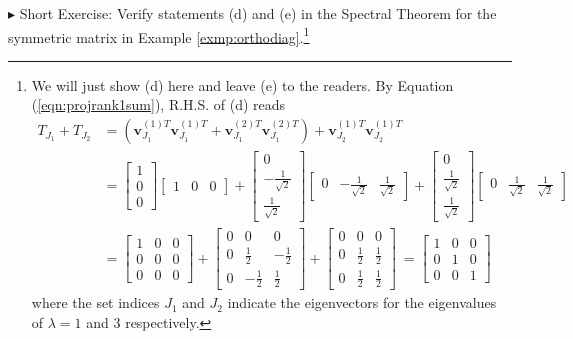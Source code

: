 $\blacktriangleright$ Short Exercise: Verify statements (d) and (e) in the Spectral Theorem for the symmetric matrix in Example \ref{exmp:orthodiag}.\footnote{We will just show (d) here and leave (e) to the readers. By Equation (\ref{eqn:projrank1sum}), R.H.S. of (d) reads
\begin{align*}
T_{J_1} + T_{J_2} &= (\textbf{v}_{J_1}^{(1)T}\textbf{v}_{J_1}^{(1)T} + \textbf{v}_{J_1}^{(2)T}\textbf{v}_{J_1}^{(2)T}) + \textbf{v}_{J_2}^{(1)T}\textbf{v}_{J_2}^{(1)T} \\
&= \begin{bmatrix}
1 \\
0 \\
0
\end{bmatrix}
\begin{bmatrix}
1 & 0 & 0
\end{bmatrix} + 
\begin{bmatrix}
0 \\
-\frac{1}{\sqrt{2}} \\
\frac{1}{\sqrt{2}}
\end{bmatrix}
\begin{bmatrix}
0 & -\frac{1}{\sqrt{2}} & \frac{1}{\sqrt{2}}
\end{bmatrix} +
\begin{bmatrix}
0 \\
\frac{1}{\sqrt{2}} \\
\frac{1}{\sqrt{2}}
\end{bmatrix}
\begin{bmatrix}
0 & \frac{1}{\sqrt{2}} & \frac{1}{\sqrt{2}}
\end{bmatrix} \\
&=
\begin{bmatrix}
1 & 0 & 0 \\
0 & 0 & 0 \\
0 & 0 & 0
\end{bmatrix}
+
\begin{bmatrix}
0 & 0 & 0 \\
0 & \frac{1}{2} & -\frac{1}{2} \\
0 & -\frac{1}{2} & \frac{1}{2}
\end{bmatrix}
+
\begin{bmatrix}
0 & 0 & 0 \\
0 & \frac{1}{2} & \frac{1}{2} \\
0 & \frac{1}{2} & \frac{1}{2}
\end{bmatrix}\
=
\begin{bmatrix}
1 & 0 & 0 \\
0 & 1 & 0 \\
0 & 0 & 1
\end{bmatrix}
\end{align*}
where the set indices $J_1$ and $J_2$ indicate the eigenvectors for the eigenvalues of $\lambda = 1$ and $3$ respectively.
}

